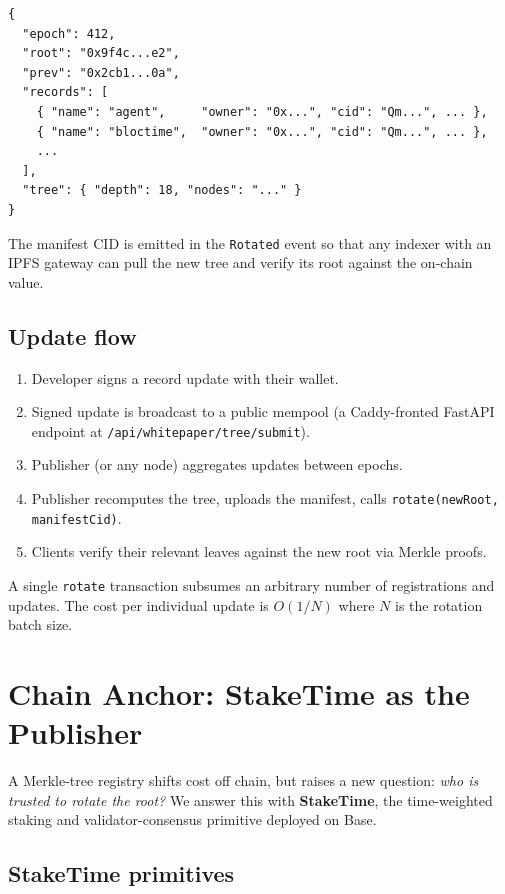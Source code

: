 \documentclass[11pt,a4paper]{article}
\begin{document}
\begin{lstlisting}[basicstyle=\ttfamily\small,frame=single,backgroundcolor=\color{codebg}]
{
  "epoch": 412,
  "root": "0x9f4c...e2",
  "prev": "0x2cb1...0a",
  "records": [
    { "name": "agent",     "owner": "0x...", "cid": "Qm...", ... },
    { "name": "bloctime",  "owner": "0x...", "cid": "Qm...", ... },
    ...
  ],
  "tree": { "depth": 18, "nodes": "..." }
}
\end{lstlisting}

The manifest CID is emitted in the \texttt{Rotated} event so that any indexer with an IPFS gateway can pull the new tree and verify its root against the on-chain value.

\subsection{Update flow}

\begin{enumerate}
    \item Developer signs a record update with their wallet.
    \item Signed update is broadcast to a public mempool (a Caddy-fronted FastAPI endpoint at \texttt{/api/whitepaper/tree/submit}).
    \item Publisher (or any node) aggregates updates between epochs.
    \item Publisher recomputes the tree, uploads the manifest, calls \texttt{rotate(newRoot, manifestCid)}.
    \item Clients verify their relevant leaves against the new root via Merkle proofs.
\end{enumerate}

A single \texttt{rotate} transaction subsumes an arbitrary number of registrations and updates. The cost per individual update is $O(1/N)$ where $N$ is the rotation batch size.

\section{Chain Anchor: StakeTime as the Publisher}
\label{sec:chain}

A Merkle-tree registry shifts cost off chain, but raises a new question: \emph{who is trusted to rotate the root?} We answer this with \textbf{StakeTime}, the time-weighted staking and validator-consensus primitive deployed on Base.

\subsection{StakeTime primitives}
\end{document}
